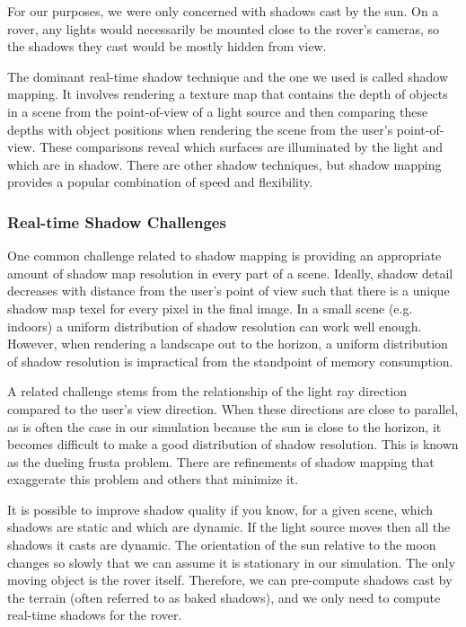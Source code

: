 \documentclass[twocolumn,letterpaper]{IEEEAerospaceCLS}  %
\begin{document}
For our purposes, we were only concerned with shadows cast by the sun. On a rover, any lights would necessarily be mounted close to the rover's cameras, so the shadows they cast would be mostly hidden from view.

The dominant real-time shadow technique and the one we used is called shadow mapping. It involves rendering a texture map that contains the depth of objects in a scene from the point-of-view of a light source and then comparing these depths with object positions when rendering the scene from the user's point-of-view. These comparisons reveal which surfaces are illuminated by the light and which are in shadow. There are other shadow techniques, but shadow mapping provides a popular combination of speed and flexibility.

\subsubsection{Real-time Shadow Challenges}
One common challenge related to shadow mapping is providing an appropriate amount of shadow map resolution in every part of a scene. Ideally, shadow detail decreases with distance from the user's point of view such that there is a unique shadow map texel for every pixel in the final image. In a small scene (e.g. indoors) a uniform distribution of shadow resolution can work well enough. However, when rendering a landscape out to the horizon, a uniform distribution of shadow resolution is impractical from the standpoint of memory consumption.

A related challenge stems from the relationship of the light ray direction compared to the user's view direction. When these directions are close to parallel, as is often the case in our simulation because the sun is close to the horizon, it becomes difficult to make a good distribution of shadow resolution. This is known as the dueling frusta problem. There are refinements of shadow mapping that exaggerate this problem and others that minimize it.

It is possible to improve shadow quality if you know, for a given scene, which shadows are static and which are dynamic. If the light source moves then all the shadows it casts are dynamic. The orientation of the sun relative to the moon changes so slowly that we can assume it is stationary in our simulation. The only moving object is the rover itself. Therefore, we can pre-compute shadows cast by the terrain (often referred to as baked shadows), and we only need to compute real-time shadows for the rover.
\end{document}
